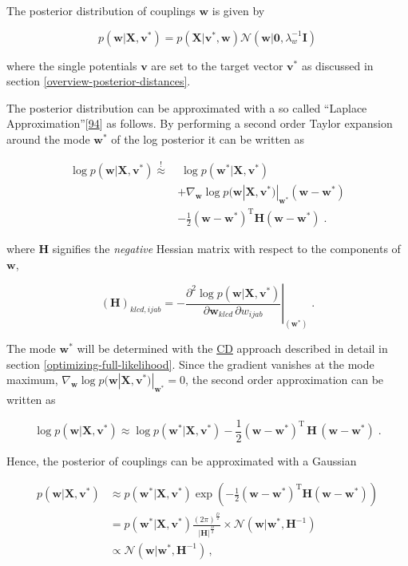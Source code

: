 \documentclass[11pt,a4paper,twoside]{book}
\newcommand{\Gauss}{\mathcal{N}}
\renewcommand{\H}{\mathbf{H}}
\newcommand{\I}{\mathbf{I}}
\renewcommand{\v}{\mathbf{v}}
\newcommand{\w}{\mathbf{w}}
\newcommand{\wijab}{w_{ijab}}
\newcommand{\X}{\mathbf{X}}
\theoremstyle{definition}
\theoremstyle{definition}
\theoremstyle{remark}
\begin{document}
The posterior distribution of couplings \(\w\) is given by

\begin{equation}
p(\w | \X , \v^*) = p(\X | \v^*, \w) \Gauss (\w | \mathbf{0}, \lambda_w^{-1} \I)
\end{equation}

where the single potentials \(\v\) are set to the target vector \(\v^*\)
as discussed in section \ref{overview-posterior-distances}.

The posterior distribution can be approximated with a so called
``Laplace Approximation''{[}\protect\hyperlink{ref-Murphy2012}{94}{]} as
follows. By performing a second order Taylor expansion around the mode
\(\w^*\) of the log posterior it can be written as

\begin{align}
    \log p(\w | \X , \v^*) \overset{!}{\approx} &  \;  \log p(\w^* | \X , \v^*) \nonumber\\
                & + \nabla_\w \log p(\w | \X , \v^*)|_{\w^*}(\w-\w^*) \nonumber\\ 
                & - \frac{1}{2} (\w-\w^*)^{\mathrm{T}} \H (\w-\w^*)  \; .
\end{align}

where \(\H\) signifies the \emph{negative} Hessian matrix with respect
to the components of \(\w\),

\begin{equation}
    (\H)_{klcd, ijab} = - \left. \frac{\partial^2  \log p(\w | \X , \v^{*})}{\partial \w_{klcd} \, \partial \wijab  } \right|_{(\w^{*})} \; .
\end{equation}

The mode \(\w^*\) will be determined with the
\protect\hyperlink{abbrev}{CD} approach described in detail in section
\ref{optimizing-full-likelihood}. Since the gradient vanishes at the
mode maximum, \(\nabla_\w \log p(\w | \X , \v^*)|_{\w^*} = 0\), the
second order approximation can be written as

\begin{equation}
    \log p(\w | \X , \v^*) {\approx}  \log p(\w^* | \X , \v^*)  - \frac{1}{2} (\w-\w^*)^{\mathrm{T}} \, \H \, (\w-\w^*)  \;.
\end{equation}

Hence, the posterior of couplings can be approximated with a Gaussian

\begin{align}
   p(\w | \X , \v^*) &\approx p(\w^* | \X , \v^*) \exp \left( - \frac{1}{2} (\w-\w^*)^{\mathrm{T}} \H  (\w -\w^*) \right) \nonumber \\
              &= p(\w^* | \X , \v^*) \frac{(2 \pi)^\frac{D}{2}} { |\H|^\frac{D}{2}} \times \Gauss (\w | \w^*, \H^{-1} ) \nonumber \\
              &\propto  \Gauss (\w | \w^*, \H^{-1}) \,,
\label{eq:reg-lik-gauss-approx}
\end{align}
\end{document}
